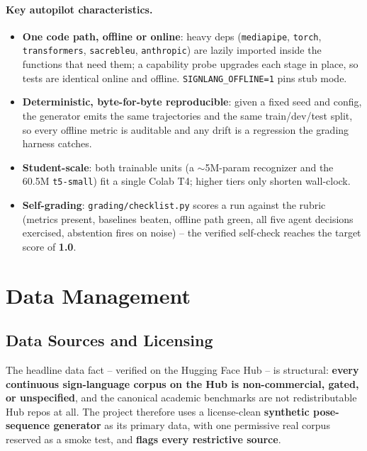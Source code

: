 \documentclass[12pt,a4paper]{article}
\begin{document}
\paragraph{Key autopilot characteristics.}
\begin{itemize}\setlength\itemsep{0.15em}
  \item \textbf{One code path, offline or online}: heavy deps (\texttt{mediapipe}, \texttt{torch}, \texttt{transformers}, \texttt{sacrebleu}, \texttt{anthropic}) are lazily imported inside the functions that need them; a capability probe upgrades each stage in place, so tests are identical online and offline. \texttt{SIGNLANG\_OFFLINE=1} pins stub mode.
  \item \textbf{Deterministic, byte-for-byte reproducible}: given a fixed seed and config, the generator emits the same trajectories and the same train/dev/test split, so every offline metric is auditable and any drift is a regression the grading harness catches.
  \item \textbf{Student-scale}: both trainable units (a $\sim$5M-param recognizer and the 60.5M \texttt{t5-small}) fit a single Colab T4; higher tiers only shorten wall-clock.
  \item \textbf{Self-grading}: \texttt{grading/checklist.py} scores a run against the rubric (metrics present, baselines beaten, offline path green, all five agent decisions exercised, abstention fires on noise) -- the verified self-check reaches the target score of \textbf{1.0}.
\end{itemize}

\section{Data Management}

\subsection{Data Sources and Licensing}

The headline data fact -- verified on the Hugging Face Hub -- is structural: \textbf{every continuous sign-language corpus on the Hub is non-commercial, gated, or unspecified}, and the canonical academic benchmarks are not redistributable Hub repos at all. The project therefore uses a license-clean \textbf{synthetic pose-sequence generator} as its primary data, with one permissive real corpus reserved as a smoke test, and \textbf{flags every restrictive source}.
\end{document}
